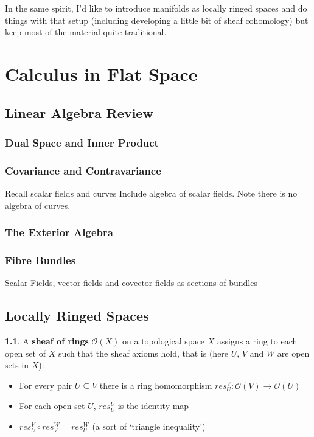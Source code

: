 \documentclass[oneside,english]{amsbook}
\numberwithin{section}{chapter}
\theoremstyle{plain}
\theoremstyle{definition}
\newtheorem{defn}[thm]{\protect\definitionname}
\providecommand{\definitionname}{Definition}
\begin{document}
	In the same spirit, I'd like to introduce manifolds as locally ringed spaces and do things with that setup (including developing a little bit of sheaf cohomology) but keep most of the material quite traditional. 

	\chapter{Calculus in Flat Space}
	
		\section{Linear Algebra Review}
			\subsection{Dual Space and Inner Product}
			\subsection{Covariance and Contravariance}
			Recall scalar fields and curves
			Include algebra of scalar fields. Note there is no algebra of curves. 
			\subsection{The Exterior Algebra}
		\subsection{Fibre Bundles}
		Scalar Fields, vector fields and covector fields as sections of bundles
		
		\section{Locally Ringed Spaces}
		
			\begin{defn} 
				A \textbf{sheaf of rings} $\mathscr{O}(X)$ on a topological space $X$ assigns a ring to each open set of $X$ such that the sheaf axioms hold, that is (here $U$, $V$ and $W$ are open sets in $X$):
				\begin{itemize}
					\item For every pair $U\subseteq V$ there is a ring homomorphism $res_U^V: \mathscr{O}(V)\to \mathscr{O}(U)$
					\item For each open set $U$, $res_U^U$ is the identity map
					\item $res_U^V \circ res_V^W = res_U^W$ (a sort of `triangle inequality')
				\end{itemize}
			\end{defn}
			
\end{document}
